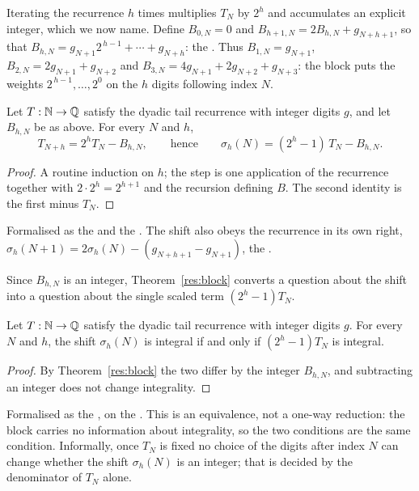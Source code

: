 \documentclass[11pt]{article}
\begin{document}
Iterating the recurrence $h$ times multiplies $T_N$ by $2^{h}$ and accumulates
an explicit integer, which we now name.  Define
$B_{0,N}=0$ and $B_{h+1,N}=2B_{h,N}+g_{N+h+1}$, so that
$B_{h,N}=g_{N+1}2^{\,h-1}+\cdots+g_{N+h}$: the
.
Thus $B_{1,N}=g_{N+1}$, $B_{2,N}=2g_{N+1}+g_{N+2}$ and
$B_{3,N}=4g_{N+1}+2g_{N+2}+g_{N+3}$: the block puts the weights
$2^{\,h-1},\ldots,2^{0}$ on the $h$ digits following index $N$.

\begin{theorem}\label{res:block}
Let $T:\mathbb{N}\to\mathbb{Q}$ satisfy the dyadic tail recurrence with integer digits $g$, and
let $B_{h,N}$ be as above.  For every $N$ and $h$,
\[
 T_{N+h}=2^{h}T_N-B_{h,N},
 \qquad\text{hence}\qquad
 \sigma_h(N)=(2^{h}-1)\,T_N-B_{h,N} .
\]
\end{theorem}

\begin{proof}
A routine induction on $h$; the step is one application of the recurrence together with
$2\cdot2^{h}=2^{h+1}$ and the recursion defining $B$.  The second identity is
the first minus $T_N$.
\end{proof}

\noindent Formalised as the
 and the
.  The shift also obeys the recurrence in its own right,
$\sigma_h(N+1)=2\sigma_h(N)-(g_{N+h+1}-g_{N+1})$, the
.

Since $B_{h,N}$ is an integer, Theorem~\ref{res:block} converts a question about
the shift into a question about the single scaled term $(2^{h}-1)T_N$.

\begin{theorem}\label{res:shiftiff}
Let $T:\mathbb{N}\to\mathbb{Q}$ satisfy the dyadic tail recurrence with integer digits $g$.
For every $N$ and $h$, the shift $\sigma_h(N)$ is integral if and only if
$(2^{h}-1)T_N$ is integral.
\end{theorem}

\begin{proof}
By Theorem~\ref{res:block} the two differ by the integer $B_{h,N}$, and
subtracting an integer does not change integrality.
\end{proof}

\noindent Formalised as the
, on the
.  This is an equivalence, not a one-way reduction: the block
carries no information about integrality, so the two conditions are the same
condition.  Informally, once $T_N$ is fixed no choice of the digits after index
$N$ can change whether the shift $\sigma_h(N)$ is an integer; that is decided
by the denominator of $T_N$ alone.
\end{document}
